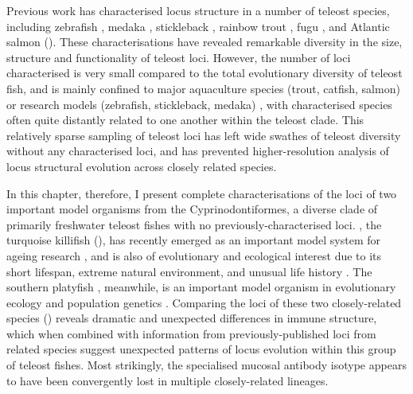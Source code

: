 Previous work has characterised \igh{} locus structure in a number of teleost species, including zebrafish \parencite{danilova2005zebrafish}, medaka \parencite{magadan2011medaka}, stickleback \parencite{bao2010stickleback,gambondeza2011stickleback}, rainbow trout \parencite{hansen2005trout}, fugu \parencite{savan2005fugu}, and Atlantic salmon \parencite{yasuike2010salmon} (). These characterisations have revealed remarkable diversity in the size, structure and functionality of teleost \igh{} loci. However, the number of loci characterised is very small compared to the total evolutionary diversity of teleost fish, and is mainly confined to major aquaculture species (trout, catfish, salmon) or research models (zebrafish, stickleback, medaka) \parencite{fillatreau2013astonishing,bengten2015fishantibodies}, with characterised species often quite distantly related to one another within the teleost clade. This relatively sparse sampling of teleost \igh{} loci has left wide swathes of teleost diversity without any characterised \igh{} loci, and has prevented higher-resolution analysis of locus structural evolution across closely related species.

In this chapter, therefore, I present complete characterisations of the \igh{} loci of two important model organisms from the Cyprinodontiformes, a diverse clade of primarily freshwater teleost fishes with no previously-characterised \igh{} loci. \nfu, the turquoise killifish (), has recently emerged as an important model system for ageing research \parencite{harel2015platform,valenzano2015genome}, and is also of evolutionary and ecological interest due to its short lifespan, extreme natural environment, and unusual life history \parencite{cellerino2016bush}. The southern platyfish \xma, meanwhile, is an important model organism in evolutionary ecology and population genetics \parencite{schartl2013platyfish}. Comparing the \igh{} loci of these two closely-related species () reveals dramatic and unexpected differences in immune structure, which when combined with information from previously-published loci from related species suggest unexpected patterns of locus evolution within this group of teleost fishes. Most strikingly, the specialised mucosal antibody isotype  appears to have been convergently lost in multiple closely-related lineages. 

